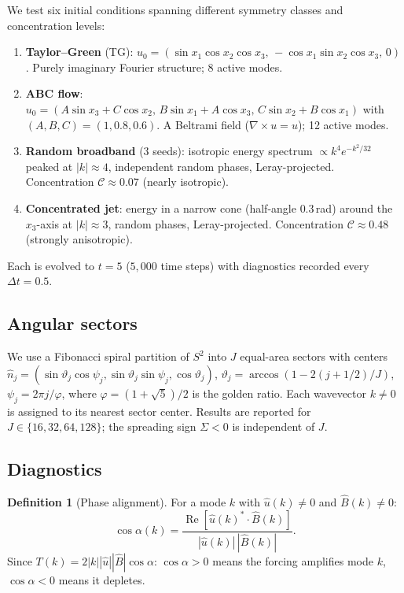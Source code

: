 \documentclass[11pt]{article}
\theoremstyle{definition}
\newtheorem{definition}[theorem]{Definition}
\newcommand{\cC}{\mathcal{C}}
\DeclareMathOperator{\re}{Re}
\begin{document}
We test six initial conditions spanning different symmetry
classes and concentration levels:
\begin{enumerate}[leftmargin=2em]
\item \textbf{Taylor--Green} (TG):
  $u_0 = (\sin x_1\cos x_2\cos x_3,\,
  -\cos x_1\sin x_2\cos x_3,\,0)$.
  Purely imaginary Fourier structure; 8 active modes.
\item \textbf{ABC flow}:
  $u_0 = (A\sin x_3+C\cos x_2,\,B\sin x_1+A\cos x_3,\,
  C\sin x_2+B\cos x_1)$ with $(A,B,C)=(1,0.8,0.6)$.
  A Beltrami field ($\nabla\times u = u$); 12 active modes.
\item \textbf{Random broadband} (3 seeds):
  isotropic energy spectrum $\propto k^4e^{-k^2/32}$
  peaked at $|k|\approx 4$, independent random phases,
  Leray-projected.  Concentration $\cC\approx 0.07$
  (nearly isotropic).
\item \textbf{Concentrated jet}:
  energy in a narrow cone (half-angle $0.3$\,rad) around
  the $x_3$-axis at $|k|\approx 3$, random phases,
  Leray-projected.  Concentration $\cC\approx 0.48$
  (strongly anisotropic).
\end{enumerate}
Each is evolved to $t=5$ ($5{,}000$ time steps) with
diagnostics recorded every $\Delta t=0.5$.

\subsection{Angular sectors}

We use a Fibonacci spiral partition of $S^2$ into $J$
equal-area sectors with centers
$\hat n_j = (\sin\vartheta_j\cos\psi_j,
\sin\vartheta_j\sin\psi_j,\cos\vartheta_j)$,
$\vartheta_j = \arccos(1-2(j+1/2)/J)$,
$\psi_j = 2\pi j/\varphi$, where
$\varphi = (1+\sqrt{5})/2$ is the golden ratio.
Each wavevector $k\neq 0$ is assigned to its nearest
sector center.  Results are reported for
$J\in\{16,32,64,128\}$; the spreading sign $\Sigma<0$
is independent of $J$.

\subsection{Diagnostics}

\begin{definition}[Phase alignment]
\label{def:phase-align}
For a mode $k$ with $\hat u(k)\neq 0$ and
$\hat B(k)\neq 0$:
\begin{equation}
\cos\alpha(k) = \frac{\re[\hat u(k)^*\cdot\hat B(k)]}
{|\hat u(k)|\,|\hat B(k)|}.
\end{equation}
Since $T(k) = 2|k||\hat u||\hat B|\cos\alpha$:
$\cos\alpha>0$ means the forcing amplifies mode $k$,
$\cos\alpha<0$ means it depletes.
\end{definition}
\end{document}

